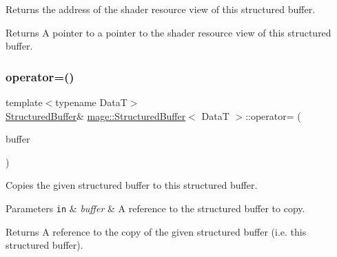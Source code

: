Returns the address of the shader resource view of this structured buffer.

\begin{DoxyReturn}{Returns}
A pointer to a pointer to the shader resource view of this structured buffer. 
\end{DoxyReturn}
\hypertarget{structmage_1_1_structured_buffer_ac00255155ab1eb61244392adcf262d40}{}\label{structmage_1_1_structured_buffer_ac00255155ab1eb61244392adcf262d40} 
\subsubsection{\texorpdfstring{operator=()}{operator=()}\hspace{0.1cm}{\footnotesize\ttfamily [1/2]}}
{\footnotesize\ttfamily template$<$typename DataT$>$ \\
\hyperlink{structmage_1_1_structured_buffer}{Structured\+Buffer}\& \hyperlink{structmage_1_1_structured_buffer}{mage\+::\+Structured\+Buffer}$<$ DataT $>$\+::operator= (\begin{DoxyParamCaption}\item[{const \hyperlink{structmage_1_1_structured_buffer}{Structured\+Buffer}$<$ DataT $>$ \&}]{buffer }\end{DoxyParamCaption})\hspace{0.3cm}{\ttfamily [delete]}}

Copies the given structured buffer to this structured buffer.


\begin{DoxyParams}[1]{Parameters}
\mbox{\tt in}  & {\em buffer} & A reference to the structured buffer to copy. \\
\hline
\end{DoxyParams}
\begin{DoxyReturn}{Returns}
A reference to the copy of the given structured buffer (i.\+e. this structured buffer). 
\end{DoxyReturn}
\hypertarget{structmage_1_1_structured_buffer_a2647510e153d15b89f860e2a5c68e231}{}\label{structmage_1_1_structured_buffer_a2647510e153d15b89f860e2a5c68e231} 
